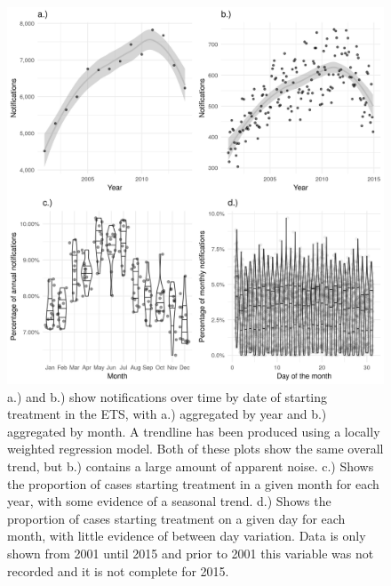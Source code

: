 \documentclass[11pt,twoside]{bristolthesis}
\begin{document}
  \begin{figure}
  
  {\centering \includegraphics[width=0.8\linewidth,]{chapters/tb-epi-england/figures/plot-detection-starttreatdate} 
  
  }
  
  \caption[a.) and b.) show notifications over time by date of starting treatment in the ETS, with a.) aggregated by year and  b.) aggregated by month.]{a.) and b.) show notifications over time by date of starting treatment in the ETS, with a.) aggregated by year and  b.) aggregated by month. A trendline has been produced using a locally weighted regression model. Both of these plots show the same overall trend, but b.) contains a large amount of apparent noise. c.) Shows the proportion of cases starting treatment in a given month for each year, with some evidence of a seasonal trend. d.) Shows the proportion of cases starting treatment on a given day for each month, with little evidence of between day variation. Data is only shown from 2001 until 2015 and prior to 2001 this variable was not recorded and it is not complete for 2015.}\label{fig:plot-detection-starttreatdate}
  \end{figure}
\end{document}
